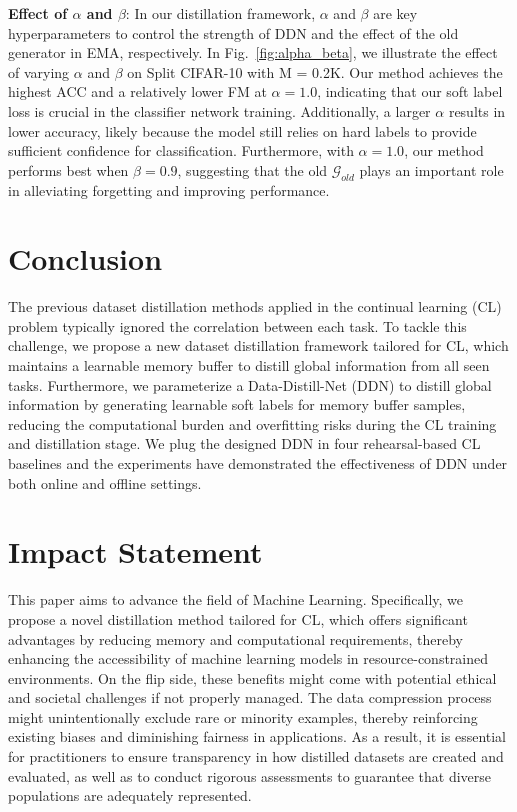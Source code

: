 \documentclass[table, xcdraw]{article}
\theoremstyle{plain}
\theoremstyle{definition}
\theoremstyle{remark}
\begin{document}
\textbf{Effect of $\alpha$ and $\beta$}:
In our distillation framework, $\alpha$ and $\beta$ are key hyperparameters to control the strength of DDN and the effect of the old generator in EMA, respectively. In Fig.~\ref{fig:alpha_beta}, we illustrate the effect of varying $\alpha$ and $\beta$ on Split CIFAR-10 with M = 0.2K. Our method achieves the highest ACC and a relatively lower FM at $\alpha=1.0$, indicating that our soft label loss is crucial in the classifier network training. Additionally, a larger $\alpha$ results in lower accuracy, likely because the model still relies on hard labels to provide sufficient confidence for classification.
Furthermore, with $\alpha=1.0$, our method performs best when $\beta=0.9$, suggesting that the old $\mathcal{G}_{old}$ plays an important role in alleviating forgetting and improving performance.

\section{Conclusion}

The previous dataset distillation methods applied in the continual learning (CL) problem typically ignored the correlation between each task. To tackle this challenge, we propose a new dataset distillation framework tailored for CL, which maintains a learnable memory buffer to distill global information from all seen tasks. Furthermore, we parameterize a Data-Distill-Net (DDN) to distill global information by generating learnable soft labels for memory buffer samples, reducing the computational burden and overfitting risks during the CL training and distillation stage. We plug the designed DDN in four rehearsal-based CL baselines and the experiments have demonstrated the effectiveness of DDN under both online and offline settings.

\section*{Impact Statement}
This paper aims to advance the field of Machine Learning. Specifically, we propose a novel distillation method tailored for CL, which offers significant advantages by reducing memory and computational requirements, thereby enhancing the accessibility of machine learning models in resource-constrained environments. On the flip side, these benefits might come with potential ethical and societal challenges if not properly managed. The data compression process might unintentionally exclude rare or minority examples, thereby reinforcing existing biases and diminishing fairness in applications. As a result, it is essential for practitioners to ensure transparency in how distilled datasets are created and evaluated, as well as to conduct rigorous assessments to guarantee that diverse populations are adequately represented.
\end{document}
